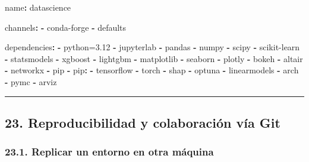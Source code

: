 \documentclass[
  doc,
  floatsintext,
  longtable,
  a4paper,
  nolmodern,
  notxfonts,
  notimes,
  12pt,
  colorlinks=true,linkcolor=blue,citecolor=blue,urlcolor=blue]{apa7}
\newenvironment{Shaded}{\begin{snugshade}}{\end{snugshade}}
\newcommand{\AttributeTok}[1]{\textcolor[rgb]{0.40,0.45,0.13}{#1}}
\newcommand{\FunctionTok}[1]{\textcolor[rgb]{0.28,0.35,0.67}{#1}}
\newcommand{\KeywordTok}[1]{\textcolor[rgb]{0.00,0.23,0.31}{\textbf{#1}}}
\begin{document}
\begin{Shaded}
\begin{Highlighting}[]
\FunctionTok{name}\KeywordTok{:}\AttributeTok{ datascience}

\FunctionTok{channels}\KeywordTok{:}
\AttributeTok{  }\KeywordTok{{-}}\AttributeTok{ conda{-}forge}
\AttributeTok{  }\KeywordTok{{-}}\AttributeTok{ defaults}

\FunctionTok{dependencies}\KeywordTok{:}
\AttributeTok{  }\KeywordTok{{-}}\AttributeTok{ python=3.12}
\AttributeTok{  }\KeywordTok{{-}}\AttributeTok{ jupyterlab}
\AttributeTok{  }\KeywordTok{{-}}\AttributeTok{ pandas}
\AttributeTok{  }\KeywordTok{{-}}\AttributeTok{ numpy}
\AttributeTok{  }\KeywordTok{{-}}\AttributeTok{ scipy}
\AttributeTok{  }\KeywordTok{{-}}\AttributeTok{ scikit{-}learn}
\AttributeTok{  }\KeywordTok{{-}}\AttributeTok{ statsmodels}
\AttributeTok{  }\KeywordTok{{-}}\AttributeTok{ xgboost}
\AttributeTok{  }\KeywordTok{{-}}\AttributeTok{ lightgbm}
\AttributeTok{  }\KeywordTok{{-}}\AttributeTok{ matplotlib}
\AttributeTok{  }\KeywordTok{{-}}\AttributeTok{ seaborn}
\AttributeTok{  }\KeywordTok{{-}}\AttributeTok{ plotly}
\AttributeTok{  }\KeywordTok{{-}}\AttributeTok{ bokeh}
\AttributeTok{  }\KeywordTok{{-}}\AttributeTok{ altair}
\AttributeTok{  }\KeywordTok{{-}}\AttributeTok{ networkx}
\AttributeTok{  }\KeywordTok{{-}}\AttributeTok{ pip}
\AttributeTok{  }\KeywordTok{{-}}\AttributeTok{ }\FunctionTok{pip}\KeywordTok{:}
\AttributeTok{    }\KeywordTok{{-}}\AttributeTok{ tensorflow}
\AttributeTok{    }\KeywordTok{{-}}\AttributeTok{ torch}
\AttributeTok{    }\KeywordTok{{-}}\AttributeTok{ shap}
\AttributeTok{    }\KeywordTok{{-}}\AttributeTok{ optuna}
\AttributeTok{    }\KeywordTok{{-}}\AttributeTok{ linearmodels}
\AttributeTok{    }\KeywordTok{{-}}\AttributeTok{ arch}
\AttributeTok{    }\KeywordTok{{-}}\AttributeTok{ pymc}
\AttributeTok{    }\KeywordTok{{-}}\AttributeTok{ arviz}
\end{Highlighting}
\end{Shaded}

\begin{center}\rule{0.5\linewidth}{0.5pt}\end{center}

\subsection{23. Reproducibilidad y colaboración vía
Git}\label{reproducibilidad-y-colaboraciuxf3n-vuxeda-git}

\subsubsection{23.1. Replicar un entorno en otra
máquina}\label{replicar-un-entorno-en-otra-muxe1quina}
\end{document}
